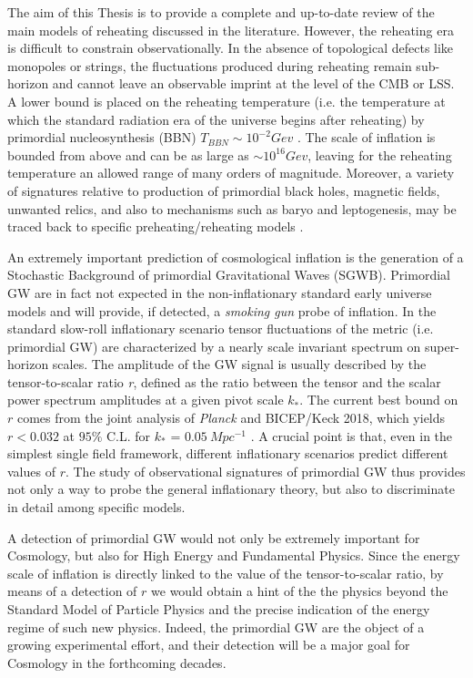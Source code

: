 \documentclass[11pt,a4paper,twoside]{book}
\begin{document}
 The aim of this Thesis is to provide a complete and up-to-date review of the main models of reheating discussed in the literature.
However, the reheating era is difficult to constrain observationally. In the absence of topological defects like monopoles or strings, the fluctuations produced during reheating remain sub-horizon and cannot leave an observable imprint at the level of the CMB or LSS. A lower bound is placed on the reheating temperature (i.e. the temperature at which the standard radiation era of the universe begins after reheating) by primordial nucleosynthesis (BBN) $ T_{BBN} \sim  10^{-2} Gev $ \cite{Steigman:nucleosynthesisIntro}. The scale of inflation is bounded from above and can be as large as $ \sim 10^{16} Gev $, leaving for the reheating temperature an allowed range of many orders of magnitude. 
Moreover, a variety of signatures relative to production of primordial black holes, magnetic fields, unwanted relics, and also to mechanisms such as baryo  and leptogenesis, may be traced back to specific preheating/reheating models \cite{ReheatingPredictionsSingleFieldModel:intro}.

An extremely important prediction of cosmological inflation is the generation of a Stochastic Background of primordial Gravitational Waves (SGWB). Primordial GW are in fact not expected in the non-inflationary standard early universe models and will provide, if detected, a \textit{smoking gun} probe of inflation. In the standard slow-roll inflationary scenario tensor fluctuations of the metric (i.e. primordial GW) are characterized by a nearly scale invariant spectrum on super-horizon scales. The amplitude of the GW signal is usually described by the tensor-to-scalar ratio \textit{r}, defined as the ratio between the tensor and the scalar power spectrum amplitudes at a given pivot scale $ k_{*} $.
The current best bound on $ \textit{r} $ comes from the joint analysis of \textit{Planck} and BICEP/Keck 2018, which yields $ r < 0.032 $ at $ 95 \% $ C.L. for $ k_{*}$ = $ 0.05\ Mpc^{-1} $ \cite{Intro:ConstraintsOnr}. 
A crucial point is that, even in the simplest single field framework, different inflationary scenarios predict different values of $r$. The study of observational signatures of primordial GW thus provides not only a way to probe the general inflationary theory, but also to discriminate in detail among specific models.

A detection of primordial GW would not only be extremely important for Cosmology, but also for High Energy and Fundamental Physics. Since the energy scale of inflation is directly linked to the value of the tensor-to-scalar ratio, by means of a detection of $ r $ we would obtain a hint of the the physics beyond the Standard Model of Particle Physics and the precise indication of the energy regime of such new physics.
Indeed, the primordial GW are the object of a growing experimental effort, and their detection will be a major goal for Cosmology in the forthcoming  decades. 
\end{document}
